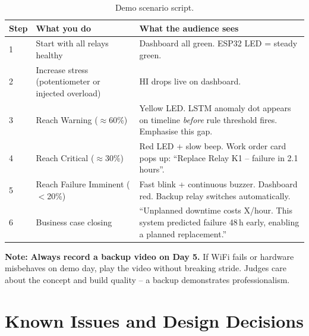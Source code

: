 \documentclass[12pt,a4paper]{article}
\newenvironment{notebox}{%
  \begin{mdframed}[backgroundcolor=notebg,linecolor=noteln,linewidth=1.5pt,
    innerleftmargin=9pt,innerrightmargin=9pt,innertopmargin=5pt,innerbottommargin=5pt]
  \textbf{\color{noteln}Note: }}{\end{mdframed}}
\begin{document}
\begin{table}[H]
\centering
\begin{tabularx}{\textwidth}{llX}
\toprule
\textbf{Step} & \textbf{What you do} & \textbf{What the audience sees} \\
\midrule
1 & Start with all relays healthy & Dashboard all green. ESP32 LED = steady green. \\
2 & Increase stress (potentiometer or injected overload) & HI drops live on dashboard. \\
3 & Reach Warning ($\approx$60\%) & Yellow LED. LSTM anomaly dot appears on timeline \textit{before} rule threshold fires. Emphasise this gap. \\
4 & Reach Critical ($\approx$30\%) & Red LED + slow beep. Work order card pops up: ``Replace Relay K1 -- failure in 2.1 hours''. \\
5 & Reach Failure Imminent ($<$20\%) & Fast blink + continuous buzzer. Dashboard red. Backup relay switches automatically. \\
6 & Business case closing & ``Unplanned downtime costs X/hour. This system predicted failure 48\,h early, enabling a planned replacement.'' \\
\bottomrule
\end{tabularx}
\caption{Demo scenario script.}
\end{table}

\begin{notebox}
\textbf{Always record a backup video on Day 5.} If WiFi fails or hardware misbehaves on demo day, play the
video without breaking stride. Judges care about the concept and build quality -- a backup demonstrates
professionalism.
\end{notebox}

\section{Known Issues and Design Decisions}
\end{document}
